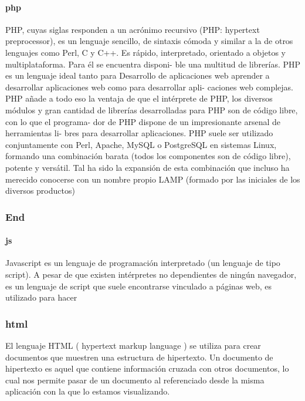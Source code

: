 \documentclass[
]{article}
\begin{document}
\hypertarget{php}{%
\paragraph{php}\label{php}}

PHP, cuyas siglas responden a un acrónimo recursivo (PHP: hypertext
preprocessor), es un lenguaje sencillo, de sintaxis cómoda y similar a
la de otros lenguajes como Perl, C y C++. Es rápido, interpretado,
orientado a objetos y multiplataforma. Para él se encuentra disponi- ble
una multitud de librerías. PHP es un lenguaje ideal tanto para
Desarrollo de aplicaciones web aprender a desarrollar aplicaciones web
como para desarrollar apli- caciones web complejas. PHP añade a todo eso
la ventaja de que el intérprete de PHP, los diversos módulos y gran
cantidad de librerías desarrolladas para PHP son de código libre, con lo
que el programa- dor de PHP dispone de un impresionante arsenal de
herramientas li- bres para desarrollar aplicaciones. PHP suele ser
utilizado conjuntamente con Perl, Apache, MySQL o PostgreSQL en sistemas
Linux, formando una combinación barata (todos los componentes son de
código libre), potente y versátil. Tal ha sido la expansión de esta
combinación que incluso ha merecido conocerse con un nombre propio LAMP
(formado por las iniciales de los diversos productos)

\hypertarget{end}{%
\subsubsection{End}\label{end}}

\hypertarget{js}{%
\paragraph{js}\label{js}}

Javascript es un lenguaje de programación interpretado (un lenguaje de
tipo script). A pesar de que existen intérpretes no dependientes de
ningún navegador, es un lenguaje de script que suele encontrarse
vinculado a páginas web, es utilizado para hacer

\hypertarget{html}{%
\subsubsection{html}\label{html}}

El lenguaje HTML ( hypertext markup language ) se utiliza para crear
documentos que muestren una estructura de hipertexto. Un documento de
hipertexto es aquel que contiene información cruzada con otros
documentos, lo cual nos permite pasar de un documento al referenciado
desde la misma aplicación con la que lo estamos visualizando.
\end{document}
